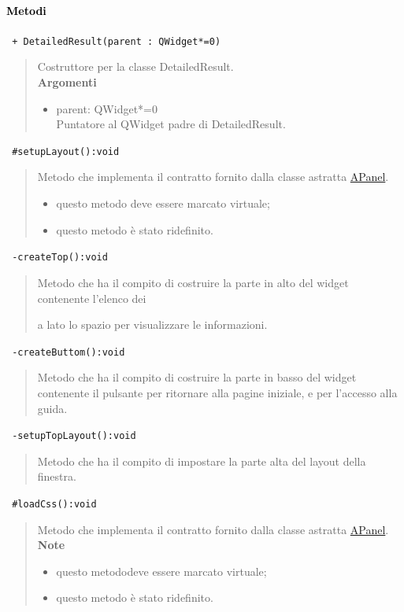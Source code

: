 \paragraph{\textcolor{black}{Metodi\\}}
\color{blue}\verb! + DetailedResult(parent : QWidget*=0)!
\begin{quote}
\color{black}Costruttore per la classe DetailedResult. \\
\textbf{Argomenti}
\begin{itemize}
\item parent: QWidget*=0  \\ Puntatore al QWidget padre di DetailedResult.
\end{itemize}
\end{quote}
\color{blue}\verb! #setupLayout():void!
\begin{quote}
\color{black} Metodo che implementa il contratto fornito dalla classe astratta \hyperref[speAPanel]{APanel}.
\begin{itemize}
\item questo metodo deve essere marcato virtuale;
\item questo metodo è stato ridefinito.
\end{itemize}
\end{quote} 
\color{blue}\verb! -createTop():void!
\begin{quote}
\color{black} Metodo che ha il compito di costruire la parte in alto del widget contenente l'elenco dei \subject e a lato lo spazio per visualizzare le informazioni.
\end{quote} 
\color{blue}\verb! -createButtom():void!
\begin{quote}
\color{black} Metodo che ha il compito di costruire la parte in basso del widget contenente il pulsante per ritornare alla pagine iniziale, e per l'accesso alla guida.
\end{quote}
\color{blue}\verb! -setupTopLayout():void!
\begin{quote}
\color{black} Metodo che ha il compito di impostare la parte alta del layout della finestra.
\end{quote}  
\color{blue}\verb! #loadCss():void!
\begin{quote}
\color{black} Metodo che implementa il contratto fornito dalla classe astratta \hyperref[speAPanel]{APanel}.\\
 \textbf{Note}
 \begin{itemize}
  \item questo metododeve essere marcato virtuale;
 \item questo metodo è stato ridefinito.
 \end{itemize}
\end{quote} 
